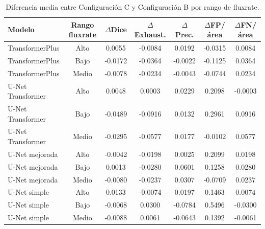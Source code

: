\begin{table}[H]
    \centering
    \small
    \caption{Diferencia media entre Configuración C y Configuración B por rango de fluxrate.}
    \label{tab:delta_configc_por_rango_fluxrate}
    \begin{tabular}{lcccccc}
        \toprule
        Modelo & Rango fluxrate & $\Delta$Dice & $\Delta$Exhaust. & $\Delta$Prec. & $\Delta$FP/área & $\Delta$FN/área \\
        \midrule
        TransformerPlus & Alto & 0.0055 & -0.0084 & 0.0192 & -0.0315 & 0.0084 \\
        TransformerPlus & Bajo & -0.0172 & -0.0364 & -0.0022 & -0.1125 & 0.0364 \\
        TransformerPlus & Medio & -0.0078 & -0.0234 & -0.0043 & -0.0744 & 0.0234 \\
        U-Net Transformer & Alto & 0.0048 & 0.0003 & 0.0229 & 0.2098 & -0.0003 \\
        U-Net Transformer & Bajo & -0.0489 & -0.0916 & 0.0132 & 0.2961 & 0.0916 \\
        U-Net Transformer & Medio & -0.0295 & -0.0577 & 0.0177 & -0.0102 & 0.0577 \\
        U-Net mejorada & Alto & -0.0042 & -0.0198 & 0.0025 & 0.2099 & 0.0198 \\
        U-Net mejorada & Bajo & 0.0013 & -0.0280 & 0.0601 & 0.1258 & 0.0280 \\
        U-Net mejorada & Medio & -0.0080 & -0.0237 & 0.0307 & -0.0709 & 0.0237 \\
        U-Net simple & Alto & 0.0133 & -0.0074 & 0.0197 & 0.1463 & 0.0074 \\
        U-Net simple & Bajo & -0.0068 & 0.0300 & -0.0784 & 0.5496 & -0.0300 \\
        U-Net simple & Medio & -0.0088 & 0.0061 & -0.0643 & 0.1392 & -0.0061 \\
        \bottomrule
    \end{tabular}
\end{table}

